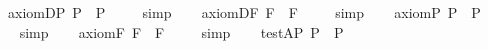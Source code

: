 \begin{isabellebody}
\ axiom{\isacharunderscore}D{\isacharunderscore}P{\isacharcolon}\ {\isachardoublequoteopen}{\isacharbrackleft}\isactrlbold {\isasymbox}{\isasymphi}\isactrlsup P\ \isactrlbold {\isasymrightarrow}\ \isactrlbold {\isasymbox}\isactrlbold {\isasymbox}{\isasymphi}\isactrlsup P{\isacharbrackright}\ {\isacharequal}\ {\isasymtop}{\isachardoublequoteclose}%
\isadelimproof
\ %
\endisadelimproof
%
\isatagproof
{}\isamarkupfalse%
\ simp\ \isamarkupfalse%
%
\endisatagproof
{\isafoldproof}%
%
\isadelimproof
%
\endisadelimproof
\isanewline
\ \isamarkupfalse%
\ axiom{\isacharunderscore}D{\isacharunderscore}F{\isacharcolon}\ {\isachardoublequoteopen}{\isacharbrackleft}\isactrlbold {\isasymbox}{\isasymphi}\isactrlsup F\ \isactrlbold {\isasymrightarrow}\ \isactrlbold {\isasymbox}\isactrlbold {\isasymbox}{\isasymphi}\isactrlsup F{\isacharbrackright}\ {\isacharequal}\ {\isasymtop}{\isachardoublequoteclose}%
\isadelimproof
\ %
\endisadelimproof
%
\isatagproof
{}\isamarkupfalse%
\ simp\ \isamarkupfalse%
%
\endisatagproof
{\isafoldproof}%
%
\isadelimproof
%
\endisadelimproof
\isanewline
\isanewline
\ \isamarkupfalse%
\ axiom{\isacharunderscore}{}{\isacharunderscore}P{\isacharcolon}\ {\isachardoublequoteopen}{\isacharbrackleft}\isactrlbold {\isasymdiamond}{\isasymphi}\isactrlsup P\ \isactrlbold {\isasymrightarrow}\ \isactrlbold {\isasymbox}\isactrlbold {\isasymdiamond}{\isasymphi}\isactrlsup P{\isacharbrackright}\ {\isacharequal}\ {\isasymtop}{\isachardoublequoteclose}%
\isadelimproof
\ %
\endisadelimproof
%
\isatagproof
{}\isamarkupfalse%
\ simp\ \isamarkupfalse%
%
\endisatagproof
{\isafoldproof}%
%
\isadelimproof
%
\endisadelimproof
\isanewline
\ \isamarkupfalse%
\ axiom{\isacharunderscore}{}{\isacharunderscore}F{\isacharcolon}\ {\isachardoublequoteopen}{\isacharbrackleft}\isactrlbold {\isasymdiamond}{\isasymphi}\isactrlsup F\ \isactrlbold {\isasymrightarrow}\ \isactrlbold {\isasymbox}\isactrlbold {\isasymdiamond}{\isasymphi}\isactrlsup F{\isacharbrackright}\ {\isacharequal}\ {\isasymtop}{\isachardoublequoteclose}%
\isadelimproof
\ %
\endisadelimproof
%
\isatagproof
{}\isamarkupfalse%
\ simp\ \isamarkupfalse%
%
\endisatagproof
{\isafoldproof}%
%
\isadelimproof
%
\endisadelimproof
\isanewline
\isanewline
\ \isamarkupfalse%
\ test{\isacharunderscore}A{\isacharunderscore}P{\isacharcolon}\ {\isachardoublequoteopen}{\isacharbrackleft}\isactrlbold {\isasymbox}\isactrlbold {\isasymdiamond}{\isasymphi}\isactrlsup P\ \isactrlbold {\isasymrightarrow}\ \isactrlbold {\isasymdiamond}{\isasymphi}\isactrlsup P{\isacharbrackright}\ {\isacharequal}\ {\isasymtop}{\isachardoublequoteclose}%

\end{isabellebody}
